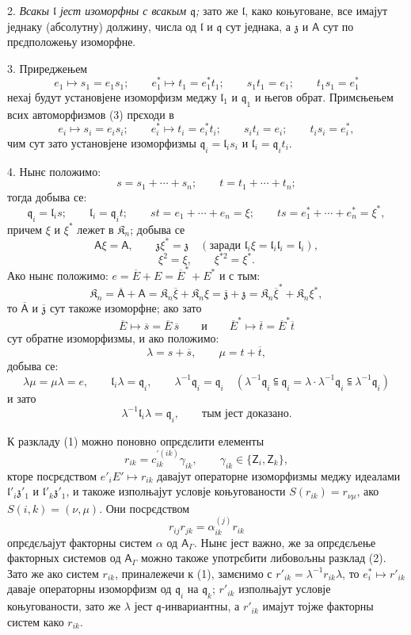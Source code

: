 \documentclass[11pt]{article}
\begin{document}
2. \emph{Всакы \(\mathfrak l\) јест изоморфны с всакым \(\mathfrak q\);} зато же \(\mathfrak l\), како коњуговане, все имајут једнаку (абсолутну) должину, числа од \(\mathfrak l\) и \(\mathfrak q\) сут једнака, а \(\mathfrak z\) и \(\mathsf{A}\) сут по прєдположењу изоморфне.

3. Приреджењем
\[
\tag{3}
e_1\mapsto s_1=e_1s_1;\qquad
e_1^*\mapsto t_1=e_1^*t_1;\qquad
s_1t_1=e_1;\qquad
t_1s_1=e_1^*
\]
нехај будут установјене изоморфизм меджу \(\mathfrak l_1\) и \(\mathfrak q_1\) и његов обрат. Примєњењем всих автоморфизмов (3) прєходи в
\[
e_i\mapsto s_i=e_is_i;\qquad
e_i^*\mapsto t_i=e_i^*t_i;\qquad
s_it_i=e_i;\qquad
t_is_i=e_i^*,
\]
чим сут зато установјене изоморфизмы \(\mathfrak q_i=\mathfrak l_is_i\) и \(\mathfrak l_i=\mathfrak q_it_i\).

4. Нынє положимо:
\[
s=s_1+\cdots+s_n;\qquad t=t_1+\cdots+t_n;
\]
тогда добыва се:
\[
\mathfrak q_i=\mathfrak l_is;\qquad
\mathfrak l_i=\mathfrak q_it;\qquad
st=e_1+\cdots+e_n=\xi;\qquad
ts=e_1^*+\cdots+e_n^*=\xi^*,
\]
причем \(\xi\) и \(\xi^*\) лежет в \(\mathfrak K_n\); добыва се
\[
\mathsf{A}\xi=\mathsf{A},\qquad \mathfrak z\xi^*=\mathfrak z\quad
(\text{заради }\mathfrak l_i\xi=\mathfrak l_i\mathfrak l_i=\mathfrak l_i),
\]
\[
\xi^2=\xi,\qquad \xi^{*2}=\xi^*.
\]
Ако нынє положимо: \(e=\overline E+E=\overline E^*+E^*\) и с тым:
\[
\mathfrak K_n=\overline{\mathsf A}+\mathsf{A}
=\mathfrak K_n\overline\xi+\mathfrak K_n\xi
=\overline{\mathfrak z}+\mathfrak z
=\mathfrak K_n\overline\xi^*+\mathfrak K_n\xi^*,
\]
то \(\overline{\mathsf A}\) и \(\overline{\mathfrak z}\) сут такоже изоморфне; ако зато
\[
\overline E\mapsto\overline s=\overline E\,\overline s
\qquad\text{и}\qquad
\overline E^*\mapsto\overline t=\overline E^*\overline t
\]
сут обратне изоморфизмы, и ако положимо:
\[
\lambda=s+\overline s,\qquad \mu=t+\overline t,
\]
добыва се:
\[
\lambda\mu=\mu\lambda=e,\qquad
\mathfrak l_i\lambda=\mathfrak q_i,\qquad
\lambda^{-1}\mathfrak q_i=\mathfrak q_i
\quad
(\lambda^{-1}\mathfrak q_i\subseteqq\mathfrak q_i
=\lambda\cdot\lambda^{-1}\mathfrak q_i\subseteqq\lambda^{-1}\mathfrak q_i)
\]
и зато
\[
\lambda^{-1}\mathfrak l_i\lambda=\mathfrak q_i,\qquad \text{тым јест доказано.}
\]

К разкладу (1) можно поновно опрєдєлити елементы
\[
r_{ik}=c_{ik}^{\prime(ik)}\gamma_{ik},\qquad \gamma_{ik}\in\{\mathsf{Z}_i,\mathsf{Z}_k\},
\]
кторе посрєдством \(e'_iE'\mapsto r_{ik}\) давајут операторне изоморфизмы меджу идеалами \(\mathfrak l'_i\mathfrak z'_1\) и \(\mathfrak l'_k\mathfrak z'_1\), и такоже изполњајут условје коњугованости \(S(r_{ik})=r_{\nu\mu}\), ако \(S(i,k)=(\nu,\mu)\). Они посрєдством
\[
r_{ij}r_{jk}=\alpha_{ik}^{(j)}r_{ik}
\]
опрєдєљајут факторны систем \(\alpha\) од \(\mathsf{A}_\Gamma\). Нынє јест важно, же за опрєдєљење факторных системов од \(\mathsf{A}_\Gamma\) можно такоже употрєбити либовољны разклад (2). Зато же ако систем \(r_{ik}\), приналежечи к (1), замєнимо с \(r'_{ik}=\lambda^{-1}r_{ik}\lambda\), то \(e_i^*\mapsto r'_{ik}\) даваје операторны изоморфизм од \(\mathfrak q_i\) на \(\mathfrak q_k\); \(r'_{ik}\) изполњајут условје коњугованости, зато же \(\lambda\) јест \(\mathfrak q\)-инвариантны, а \(r'_{ik}\) имајут тојже факторны систем како \(r_{ik}\).
\end{document}
